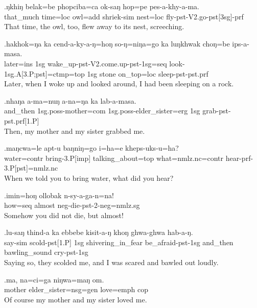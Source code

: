 \exg.ŋkhiŋ   belak=be   phopciba=ca        ok-saŋ          hop=pe     pes-a-khy-a-ma.\\
  that\_much time{\sc =loc} owl{\sc =add} shriek{\sc -sim} nest{\sc =loc} fly{\sc -pst-V2.go-pst[3sg]-prf}\\
That time, the owl, too, flew away to its nest, screeching.

\exg.hakhok=ŋa  ka  cend-a-ky-a-ŋ=hoŋ                             so-ŋ=niŋa=go                       ka  luŋkhwak choŋ=be     ips-a-masa.\\
 later{\sc =ins} {\sc 1sg} wake\_up{\sc -pst-V2.come.up-pst-1sg=seq}  look{\sc -1sg.A[3.P;pst]=ctmp=top} {\sc 1sg} stone     on\_top{\sc =loc} sleep{\sc -pst-pst.prf}\\
Later, when I woke up and looked around, I had been sleeping on a rock.

\exg.nhaŋa   a-ma=nuŋ                a-na=ŋa                      ka  lab-a-masa.\\
 and\_then {\sc 1sg.poss-}mother{\sc =com}  {\sc 1sg.poss-}elder\_sister{\sc =erg} {\sc 1sg} grab{\sc -pst-pst.prf[1.P]}\\
Then, my mother and my sister grabbed me.

\exg.maŋcwa=le          apt-u           baŋniŋ=go          i=ha=e                         kheps-uks-u=ha?\\
 water{\sc =contr} bring{\sc -3.P[imp]} talking\_about{\sc =top} what{\sc =nmlz.nc=contr} hear{\sc -prf-3.P[pst]=nmlz.nc}\\
When we told you to bring water, what did you hear?

\exg.imin=hoŋ   ollobak n-sy-a-ga-n=na!\\
 how{\sc =seq}  almost  {\sc neg-}die{\sc -pst-2-neg=nmlz.sg}\\
Somehow you did not die, but almost!

\exg.lu-saŋ        thind-a          ka  ebbebe            kisit-a-ŋ              khoŋ    ghwa-ghwa     hab-a-ŋ.\\
 say{\sc -sim} scold{\sc -pst[1.P]} {\sc 1sg} shivering\_in\_fear be\_afraid{\sc -pst-1sg} and\_then bawling\_sound cry{\sc -pst-1sg}\\
Saying so, they scolded me, and I was scared and bawled out loudly.

\exg.ma,     na=ci=ga                 niŋwa=maŋ   om.\\
 mother elder\_sister{\sc =nsg=gen} love{\sc =emph} {\sc cop}\\
Of course my mother and my sister loved me.

